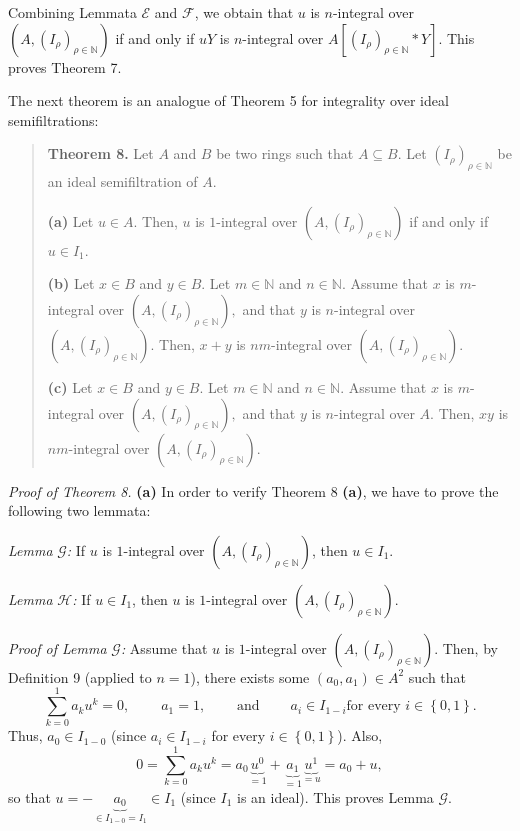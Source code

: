 \documentclass[12pt,final,notitlepage,onecolumn]{article}%
\begin{document}
Combining Lemmata $\mathcal{E}$ and $\mathcal{F}$, we obtain that $u$ is
$n$-integral over $\left(  A,\left(  I_{\rho}\right)  _{\rho\in\mathbb{N}%
}\right)  $ if and only if $uY$ is $n$-integral over $A\left[  \left(
I_{\rho}\right)  _{\rho\in\mathbb{N}}\ast Y\right]  $. This proves Theorem 7.

The next theorem is an analogue of Theorem 5 for integrality over ideal semifiltrations:

\begin{quote}
\textbf{Theorem 8.} Let $A$ and $B$ be two rings such that $A\subseteq B$. Let
$\left(  I_{\rho}\right)  _{\rho\in\mathbb{N}}$ be an ideal semifiltration of
$A$.

\textbf{(a)} Let $u\in A$. Then, $u$ is $1$-integral over $\left(  A,\left(
I_{\rho}\right)  _{\rho\in\mathbb{N}}\right)  $ if and only if $u\in I_{1}$.

\textbf{(b)} Let $x\in B$ and $y\in B$. Let $m\in\mathbb{N}$ and
$n\in\mathbb{N}$. Assume that $x$ is $m$-integral over $\left(  A,\left(
I_{\rho}\right)  _{\rho\in\mathbb{N}}\right)  ,$ and that $y$ is $n$-integral
over $\left(  A,\left(  I_{\rho}\right)  _{\rho\in\mathbb{N}}\right)  $. Then,
$x+y$ is $nm$-integral over $\left(  A,\left(  I_{\rho}\right)  _{\rho
\in\mathbb{N}}\right)  $.

\textbf{(c)} Let $x\in B$ and $y\in B$. Let $m\in\mathbb{N}$ and
$n\in\mathbb{N}$. Assume that $x$ is $m$-integral over $\left(  A,\left(
I_{\rho}\right)  _{\rho\in\mathbb{N}}\right)  ,$ and that $y$ is $n$-integral
over $A$. Then, $xy$ is $nm$-integral over $\left(  A,\left(  I_{\rho}\right)
_{\rho\in\mathbb{N}}\right)  $.
\end{quote}

\textit{Proof of Theorem 8.} \textbf{(a)} In order to verify Theorem 8
\textbf{(a)}, we have to prove the following two lemmata:

\textit{Lemma }$\mathcal{G}$\textit{:} If $u$ is $1$-integral over $\left(
A,\left(  I_{\rho}\right)  _{\rho\in\mathbb{N}}\right)  $, then $u\in I_{1}$.

\textit{Lemma} $\mathcal{H}$\textit{:} If $u\in I_{1}$, then $u$ is
$1$-integral over $\left(  A,\left(  I_{\rho}\right)  _{\rho\in\mathbb{N}%
}\right)  $.

\textit{Proof of Lemma }$\mathcal{G}$\textit{:} Assume that $u$ is
$1$-integral over $\left(  A,\left(  I_{\rho}\right)  _{\rho\in\mathbb{N}%
}\right)  $. Then, by Definition 9 (applied to $n=1$), there exists some
$\left(  a_{0},a_{1}\right)  \in A^{2}$ such that%
\[
\sum\limits_{k=0}^{1}a_{k}u^{k}=0,\ \ \ \ \ \ \ \ \ \ a_{1}%
=1,\ \ \ \ \ \ \ \ \ \ \text{and}\ \ \ \ \ \ \ \ \ \ a_{i}\in I_{1-i}\text{
for every }i\in\left\{  0,1\right\}  .
\]
Thus, $a_{0}\in I_{1-0}$ (since $a_{i}\in I_{1-i}$ for every $i\in\left\{
0,1\right\}  $). Also,%
\[
0=\sum\limits_{k=0}^{1}a_{k}u^{k}=a_{0}\underbrace{u^{0}}_{=1}%
+\underbrace{a_{1}}_{=1}\underbrace{u^{1}}_{=u}=a_{0}+u,
\]
so that $u=-\underbrace{a_{0}}_{\in I_{1-0}=I_{1}}\in I_{1}$ (since $I_{1}$ is
an ideal). This proves Lemma $\mathcal{G}$.
\end{document}
